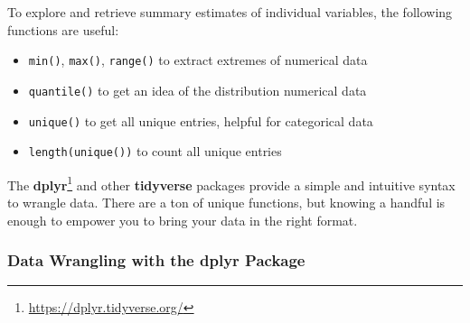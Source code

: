 \documentclass[
]{krantz}
\makeatletter
\newenvironment{Shaded}{\begin{snugshade}}{\end{snugshade}}
\newcommand{\DocumentationTok}[1]{\textcolor[rgb]{0.37,0.37,0.37}{\textbf{\textit{#1}}}}
\newcommand{\FunctionTok}[1]{\textcolor[rgb]{0,0,0}{#1}}
\newcommand{\NormalTok}[1]{#1}
\newcommand{\SpecialCharTok}[1]{\textcolor[rgb]{0,0,0}{#1}}
\providecommand{\tightlist}{%
  \setlength{\itemsep}{0pt}\setlength{\parskip}{0pt}}
\renewcommand{\href}[2]{#2\footnote{\url{#1}}}
\newenvironment{kframe}{%
\medskip{}
\setlength{\fboxsep}{.8em}
 \def\at@end@of@kframe{}%
 \ifinner\ifhmode%
  \def\at@end@of@kframe{\end{minipage}}%
  \begin{minipage}{\columnwidth}%
 \fi\fi%
 \def\FrameCommand##1{\hskip\@totalleftmargin \hskip-\fboxsep
 \colorbox{shadecolor}{##1}\hskip-\fboxsep
     \hskip-\linewidth \hskip-\@totalleftmargin \hskip\columnwidth}%
 \MakeFramed {\advance\hsize-\width
   \@totalleftmargin\z@ \linewidth\hsize
   \@setminipage}}%
 {\par\unskip\endMakeFramed%
 \at@end@of@kframe}
\renewenvironment{Shaded}{\begin{kframe}}{\end{kframe}}
\makeatother
\begin{document}
To explore and retrieve summary estimates of individual variables, the following functions are useful:

\begin{itemize}
\tightlist
\item
  \texttt{min()}, \texttt{max()}, \texttt{range()} to extract extremes of numerical data
\item
  \texttt{quantile()} to get an idea of the distribution numerical data
\item
  \texttt{unique()} to get all unique entries, helpful for categorical data
\item
  \texttt{length(unique())} to count all unique entries
\end{itemize}

\begin{Shaded}
\end{Shaded}

The \href{https://dplyr.tidyverse.org/}{\textbf{dplyr}} \citep{dplyr} and other \textbf{tidyverse} packages provide a simple and intuitive syntax to wrangle data. There are a ton of unique functions, but knowing a handful is enough to empower you to bring your data in the right format.

\hypertarget{dplyr}{%
\subsubsection{\texorpdfstring{Data Wrangling with the \textbf{dplyr} Package}{Data Wrangling with the dplyr Package}}\label{dplyr}}
\end{document}
